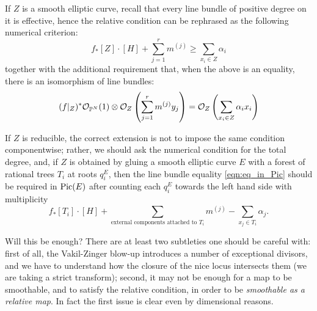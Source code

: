 \begin{rmk}
If $Z$ is a smooth elliptic curve, recall that every line bundle of positive degree on it is effective, hence the relative condition can be rephrased as the following numerical criterion:
\begin{equation*} f_*[Z]\cdot [H]+\sum_{j=1}^r m^{(j)}\geq \sum_{x_i\in Z}\alpha_i \end{equation*}
together with the additional requirement that, when the above is an equality, there is an isomorphism of line bundles:
\begin{equation}\label{eqn:eq_in_Pic}
(f|_{Z})^*\mathcal{O}_{\mathbb P^N}(1) \otimes \mathcal{O}_Z\left(\sum_{j=1}^r m^{(j)}y_j\right)=\mathcal{O}_Z\left(\sum_{x_i\in Z}\alpha_ix_i\right) 
\end{equation}
 
 If $Z$ is reducible, the correct extension is not to impose the same condition componentwise; rather, we should ask the numerical condition for the total degree, and, if $Z$ is obtained by gluing a smooth elliptic curve $E$ with a forest of rational trees $T_i$ at roots $q^E_i$, then the line bundle equality \eqref{eqn:eq_in_Pic} should be required in $\operatorname{Pic}(E)$ after counting each $q^E_i$ towards the left hand side with multiplicity
 \[f_*[T_i]\cdot [H]+\sum_{\text{external components attached to $T_i$}} m^{(j)}- \sum_{x_j\in T_i}\alpha_j.\]
 
\end{rmk}
Will this be enough? There are at least two subtleties one should be careful with: first of all, the Vakil-Zinger blow-up introduces a number of exceptional divisors, and we have to understand how the closure of the nice locus intersects them (we are taking a strict transform); second, it may not be enough for a map to be smoothable, and to satisfy the relative condition, in order to be \emph{smoothable as a relative map}. In fact the first issue is clear even by dimensional reasons.

